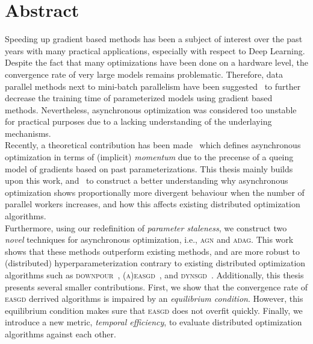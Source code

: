 %
%
%

\newpage
\chapter*{Abstract}

Speeding up gradient based methods has been a subject of interest over the past years with many practical applications, especially with respect to Deep Learning. Despite the fact that many optimizations have been done on a hardware level, the convergence rate of very large models remains problematic. Therefore, data parallel methods next to mini-batch parallelism have been suggested~\cite{dean2012large, ho2013more, hadjis2016omnivore, recht2011hogwild, louppe2010zealous, jiang2017heterogeneity, zhang2015deep} to further decrease the training time of parameterized models using gradient based methods. Nevertheless, asynchronous optimization was considered too unstable for practical purposes due to a lacking understanding of the underlaying mechanisms.\\

Recently, a theoretical contribution has been made~\cite{implicitmomentum} which defines asynchronous optimization in terms of (implicit) \emph{momentum} due to the precense of a queing model of gradients based on past parameterizations. This thesis mainly builds upon this work, and~\cite{zhang2015deep} to construct a better understanding why asynchronous optimization shows proportionally more divergent behaviour when the number of parallel workers increases, and how this affects existing distributed optimization algorithms.\\

Furthermore, using our redefinition of \emph{parameter staleness}, we construct two \emph{novel} techniques for asynchronous optimization, i.e., \textsc{agn} and \textsc{adag}. This work shows that these methods outperform existing methods, and are more robust to (distributed) hyperparameterization contrary to existing distributed optimization algorithms such as \textsc{downpour}~\cite{dean2012large}, \textsc{(a)easgd}~\cite{zhang2015deep}, and \textsc{dynsgd}~\cite{jiang2017heterogeneity}. Additionally, this thesis presents several smaller contributions. First, we show that the convergence rate of \textsc{easgd} derrived algorithms is impaired by an \emph{equilibrium condition}. However, this equilibrium condition makes sure that \textsc{easgd} does not overfit quickly. Finally, we introduce a new metric, \emph{temporal efficiency}, to evaluate distributed optimization algorithms against each other.
